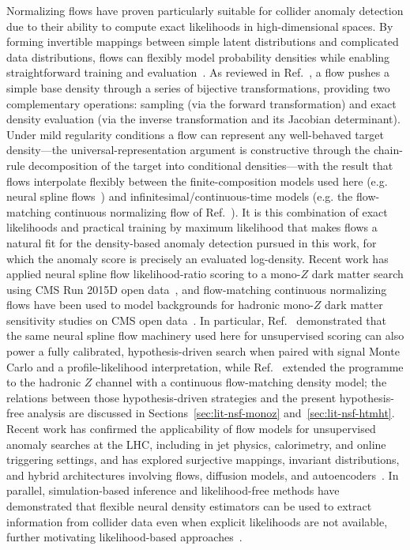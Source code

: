 \documentclass[11pt,a4paper,twocolumn]{article}
\begin{document}
Normalizing flows have proven particularly suitable for collider anomaly detection due to their ability to compute exact likelihoods in high-dimensional spaces. By forming invertible mappings between simple latent distributions and complicated data distributions, flows can flexibly model probability densities while enabling straightforward training and evaluation~\cite{Durkan2019NSF,Papamakarios2021Flows,Kobyzev2021Review}. As reviewed in Ref.~\cite{Papamakarios2021Flows}, a flow pushes a simple base density through a series of bijective transformations, providing two complementary operations: sampling (via the forward transformation) and exact density evaluation (via the inverse transformation and its Jacobian determinant). Under mild regularity conditions a flow can represent any well-behaved target density---the universal-representation argument is constructive through the chain-rule decomposition of the target into conditional densities---with the result that flows interpolate flexibly between the finite-composition models used here (e.g. neural spline flows~\cite{Durkan2019NSF}) and infinitesimal/continuous-time models (e.g. the flow-matching continuous normalizing flow of Ref.~\cite{Rasineni2026HadronicFlowMatching}). It is this combination of exact likelihoods and practical training by maximum likelihood that makes flows a natural fit for the density-based anomaly detection pursued in this work, for which the anomaly score is precisely an evaluated log-density. Recent work has applied neural spline flow likelihood-ratio scoring to a mono-$Z$ dark matter search using CMS Run 2015D open data~\cite{Rasineni2026MonoZNSF}, and flow-matching continuous normalizing flows have been used to model backgrounds for hadronic mono-$Z$ dark matter sensitivity studies on CMS open data~\cite{Rasineni2026HadronicFlowMatching}. In particular, Ref.~\cite{Rasineni2026MonoZNSF} demonstrated that the same neural spline flow machinery used here for unsupervised scoring can also power a fully calibrated, hypothesis-driven search when paired with signal Monte Carlo and a profile-likelihood interpretation, while Ref.~\cite{Rasineni2026HadronicFlowMatching} extended the programme to the hadronic $Z$ channel with a continuous flow-matching density model; the relations between those hypothesis-driven strategies and the present hypothesis-free analysis are discussed in Sections~\ref{sec:lit-nsf-monoz} and~\ref{sec:lit-nsf-htmht}. Recent work has confirmed the applicability of flow models for unsupervised anomaly searches at the LHC, including in jet physics, calorimetry, and online triggering settings, and has explored surjective mappings, invariant distributions, and hybrid architectures involving flows, diffusion models, and autoencoders~\cite{Dillon2023INN,Andreassen2019JUNIPR}. In parallel, simulation-based inference and likelihood-free methods have demonstrated that flexible neural density estimators can be used to extract information from collider data even when explicit likelihoods are not available, further motivating likelihood-based approaches~\cite{Brehmer2020Mining}.
\end{document}
